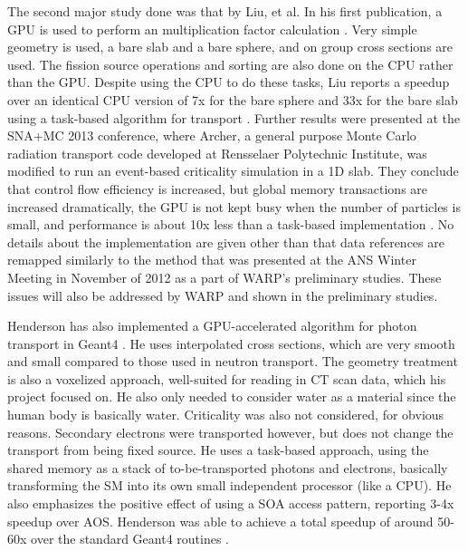 The second major study done was that by Liu, et al.  In his first publication, a GPU is used to perform an multiplication factor calculation \cite{tianyu}.  Very simple geometry is used, a bare slab and a bare sphere, and on group cross sections are used.  The fission source operations and sorting are also done on the CPU rather than the GPU.  Despite using the CPU to do these tasks, Liu reports a speedup over an identical CPU version of 7x for the bare sphere and 33x for the bare slab using a task-based algorithm for transport \cite{tianyu}.  Further results were presented at the SNA+MC 2013 conference, where Archer, a general purpose Monte Carlo radiation transport code developed at Rensselaer Polytechnic Institute, was modified to run an event-based criticality simulation in a 1D slab.  They conclude that control flow efficiency is increased, but global memory transactions are increased dramatically, the GPU is not kept busy when the number of particles is small, and performance is about 10x less than a task-based implementation \cite{tianyu_snamc}.  No details about the implementation are given other than that data references are remapped similarly to the method that was presented at the ANS Winter Meeting in November of 2012 as a part of WARP's preliminary studies.  These issues will also be addressed by WARP and shown in the preliminary studies.

Henderson has also implemented a GPU-accelerated algorithm for photon transport in Geant4 \cite{henderson}.   He uses interpolated cross sections, which are very smooth and small compared to those used in neutron transport.  The geometry treatment is also a voxelized approach, well-suited for reading in CT scan data, which his project focused on.  He also only needed to consider water as a material since the human body is basically water.  Criticality was also not considered, for obvious reasons. Secondary electrons were transported however, but does not change the transport from being fixed source. He uses a task-based approach, using the shared memory as a stack of to-be-transported photons and electrons, basically transforming the SM into its own small independent processor (like a CPU).  He also emphasizes the positive effect of using a SOA access pattern, reporting 3-4x speedup over AOS.  Henderson was able to achieve a total speedup of around 50-60x over the standard Geant4 routines \cite{henderson}.

